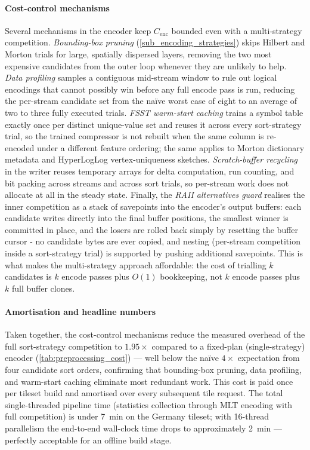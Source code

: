 \paragraph{Cost-control mechanisms}
Several mechanisms in the encoder keep $C_\text{enc}$ bounded even with a multi-strategy competition.
\emph{Bounding-box pruning} (\cref{sub_encoding_strategies}) skips Hilbert and Morton trials for large, spatially dispersed layers, removing the two most expensive candidates from the outer loop whenever they are unlikely to help.
\emph{Data profiling} samples a contiguous mid-stream window to rule out logical encodings that cannot possibly win before any full encode pass is run, reducing the per-stream candidate set from the na\"ive worst case of eight to an average of two to three fully executed trials.
\emph{\ac{FSST} warm-start caching} trains a symbol table exactly once per distinct unique-value set and reuses it across every sort-strategy trial, so the trained compressor is not rebuilt when the same column is re-encoded under a different feature ordering; the same applies to Morton dictionary metadata and HyperLogLog vertex-uniqueness sketches.
\emph{Scratch-buffer recycling} in the writer reuses temporary arrays for delta computation, run counting, and bit packing across streams and across sort trials, so per-stream work does not allocate at all in the steady state.
Finally, the \emph{\ac{RAII} alternatives guard} realises the inner competition as a stack of savepoints into the encoder's output buffers: each candidate writes directly into the final buffer positions, the smallest winner is committed in place, and the losers are rolled back simply by resetting the buffer cursor - no candidate bytes are ever copied, and nesting (per-stream competition inside a sort-strategy trial) is supported by pushing additional savepoints.
This is what makes the multi-strategy approach affordable: the cost of trialling $k$ candidates is $k$ encode passes plus $O(1)$ bookkeeping, not $k$ encode passes plus $k$ full buffer clones.

\paragraph{Amortisation and headline numbers}
Taken together, the cost-control mechanisms reduce the measured overhead of the full sort-strategy competition to $1.95\times$ compared to a fixed-plan (single-strategy) encoder (\cref{tab:preprocessing_cost}) --- well below the na\"ive $4\times$ expectation from four candidate sort orders, confirming that bounding-box pruning, data profiling, and warm-start caching eliminate most redundant work.
This cost is paid once per tileset build and amortised over every subsequent tile request.
The total single-threaded pipeline time (statistics collection through MLT encoding with full competition) is under \qty{7}{\minute} on the Germany tileset; with 16-thread parallelism the end-to-end wall-clock time drops to approximately \qty{2}{\minute} --- perfectly acceptable for an offline build stage.


